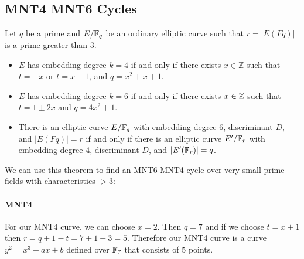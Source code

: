 \subsection{MNT4 MNT6 Cycles}
\begin{theorem}
Let $q$ be a prime and $E/\mathbb{F}_q$ be an ordinary elliptic curve such that $r= |E(Fq)|$ is a prime greater than $3$.  
\begin{itemize}
\item $E$ has embedding  degree $k= 4$ if and only if there  exists $x\in \mathbb{Z}$ such  that $t=-x$ or $t=x+1$, and $q=x^2+x+1$.\item $E$ has  embedding  degree $k= 6$ if and only if there  exists $x\in \mathbb{Z}$ such that $t= 1\pm 2x$ and $q=4x^2+1$.
\item There is an elliptic curve $E/\mathbb{F}_q$ with embedding degree $6$, discriminant $D$, and $|E(Fq)| = r$ if and only if there is an elliptic curve $E'/\mathbb{F}_r$ with embedding degree $4$, discriminant $D$, and $|E'(\mathbb{F}_r)| =q$.
\end{itemize}
\end{theorem}

We can use this theorem to find an MNT6-MNT4 cycle over very small prime fields with characteristics $>3$: 
\paragraph{MNT4}
For our MNT4 curve, we can choose $x=2$. Then $q=7$ and if we choose $t= x+1 $ then $r = q + 1 - t = 7 + 1 -3 = 5$. Therefore our MNT4 curve is a curve $y^2=x^3+ax+b$ defined over $\mathbb{F}_7$ that consists of $5$ points. 

